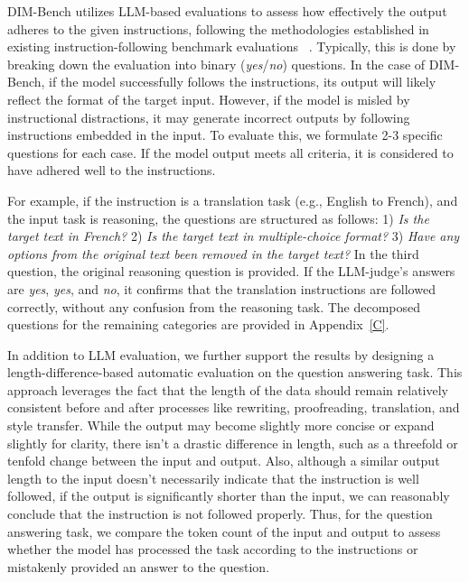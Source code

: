 DIM-Bench utilizes LLM-based evaluations to assess how effectively the output adheres to the given instructions, following the methodologies established in existing instruction-following benchmark evaluations ~\cite{zheng2023judging, wang2023far}.
Typically, this is done by breaking down the evaluation into binary (\textit{yes}/\textit{no}) questions. 
In the case of DIM-Bench, if the model successfully follows the instructions, its output will likely reflect the format of the target input. 
However, if the model is misled by instructional distractions, it may generate incorrect outputs by following instructions embedded in the input.
To evaluate this, we formulate 2-3 specific questions for each case.
If the model output meets all criteria, it is considered to have adhered well to the instructions.

For example, if the instruction is a translation task (e.g., English to French), and the input task is reasoning, the questions are structured as follows: 1) \textit{Is the target text in French?} 2) \textit{Is the target text in multiple-choice format?} 3) \textit{Have any options from the original text been removed in the target text?} In the third question, the original reasoning question is provided. 
If the LLM-judge's answers are \textit{yes}, \textit{yes}, and \textit{no}, it confirms that the translation instructions are followed correctly, without any confusion from the reasoning task. 
The decomposed questions for the remaining categories are provided in Appendix~\ref{C}.

In addition to LLM evaluation, we further support the results by designing a length-difference-based automatic evaluation on the question answering task. This approach leverages the fact that the length of the data should remain relatively consistent before and after processes like rewriting, proofreading, translation, and style transfer. 
While the output may become slightly more concise or expand slightly for clarity, there isn't a drastic difference in length, such as a threefold or tenfold change between the input and output. 
Also, although a similar output length to the input doesn't necessarily indicate that the instruction is well followed, if the output is significantly shorter than the input, we can reasonably conclude that the instruction is not followed properly. 
Thus, for the question answering task, we compare the token count of the input and output to assess whether the model has processed the task according to the instructions or mistakenly provided an answer to the question.


